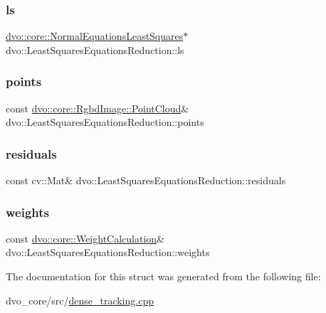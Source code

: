 \subsubsection{\texorpdfstring{ls}{ls}}
{\footnotesize\ttfamily \mbox{\hyperlink{classdvo_1_1core_1_1_normal_equations_least_squares}{dvo\+::core\+::\+Normal\+Equations\+Least\+Squares}}$\ast$ dvo\+::\+Least\+Squares\+Equations\+Reduction\+::ls}

\mbox{\label{structdvo_1_1_least_squares_equations_reduction_a31ca8e056a271c3f3c99140e679a55c1}} 
\subsubsection{\texorpdfstring{points}{points}}
{\footnotesize\ttfamily const \mbox{\hyperlink{structdvo_1_1core_1_1_rgbd_image_a56820965eb98427d06e6733fe333cdc5}{dvo\+::core\+::\+Rgbd\+Image\+::\+Point\+Cloud}}\& dvo\+::\+Least\+Squares\+Equations\+Reduction\+::points}

\mbox{\label{structdvo_1_1_least_squares_equations_reduction_a6140e6f4c600016951877b7f79efeec1}} 
\subsubsection{\texorpdfstring{residuals}{residuals}}
{\footnotesize\ttfamily const cv\+::\+Mat\& dvo\+::\+Least\+Squares\+Equations\+Reduction\+::residuals}

\mbox{\label{structdvo_1_1_least_squares_equations_reduction_a135763297b1e3bcee21189e0f5014fe4}} 
\subsubsection{\texorpdfstring{weights}{weights}}
{\footnotesize\ttfamily const \mbox{\hyperlink{classdvo_1_1core_1_1_weight_calculation}{dvo\+::core\+::\+Weight\+Calculation}}\& dvo\+::\+Least\+Squares\+Equations\+Reduction\+::weights}



The documentation for this struct was generated from the following file\+:\begin{DoxyCompactItemize}
\item 
dvo\+\_\+core/src/\mbox{\hyperlink{dense__tracking_8cpp}{dense\+\_\+tracking.\+cpp}}\end{DoxyCompactItemize}
